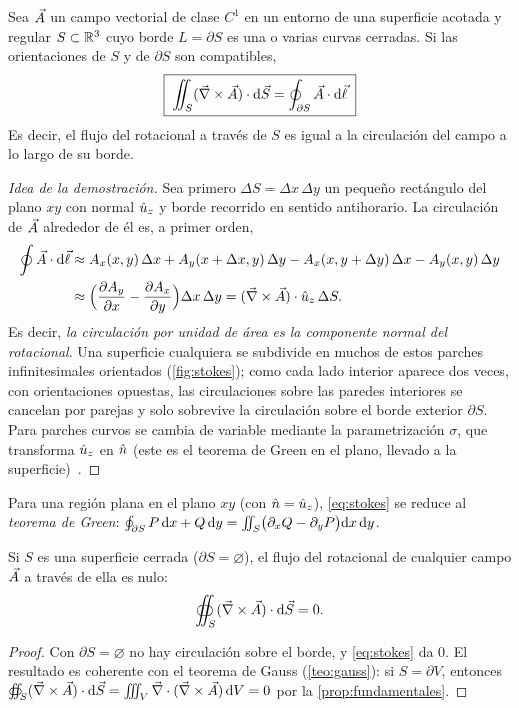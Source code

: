 \begin{teorema}\label{teo:stokes}
Sea $\vec{A}$ un campo vectorial de clase $C^{1}$ en un entorno de una superficie
acotada y regular $S\subset\mathbb{R}^{3}$ cuyo borde $L=\partial S$ es una o varias
curvas cerradas. Si las orientaciones de $S$ y de $\partial S$ son compatibles,
\begin{equation}\label{eq:stokes}
  \boxed{\;\iint_{S}(\vec{\nabla}\times\vec{A})\cdot\mathrm{d}\vec{S}=\oint_{\partial S}\vec{A}\cdot\mathrm{d}\vec{\ell}\;}
\end{equation}
Es decir, el flujo del rotacional a través de $S$ es igual a la circulación del
campo a lo largo de su borde.
\end{teorema}
\begin{proof}[Idea de la demostración]
Sea primero $\Delta S=\Delta x\,\Delta y$ un pequeño rectángulo del plano $xy$ con
normal $\hat{u}_{z}$ y borde recorrido en sentido antihorario. La circulación de
$\vec{A}$ alrededor de él es, a primer orden,
\begin{align*}
  \oint\vec{A}\cdot\mathrm{d}\vec{\ell}&\approx A_x(x,y)\,\Delta x+A_y(x+\Delta x,y)\,\Delta y
     -A_x(x,y+\Delta y)\,\Delta x-A_y(x,y)\,\Delta y\\
  &\approx\Bigl(\frac{\partial A_y}{\partial x}-\frac{\partial A_x}{\partial y}\Bigr)\Delta x\,\Delta y
   =(\vec{\nabla}\times\vec{A})\cdot\hat{u}_{z}\,\Delta S .
\end{align*}
Es decir, \emph{la circulación por unidad de área es la componente normal del
rotacional}. Una superficie cualquiera se subdivide en muchos de estos parches
infinitesimales orientados (\cref{fig:stokes}); como cada lado interior aparece
dos veces, con orientaciones opuestas, las circulaciones sobre las paredes
interiores se cancelan por parejas y solo sobrevive la circulación sobre el borde
exterior $\partial S$. Para parches curvos se cambia de variable mediante la
parametrización $\sigma$, que transforma $\hat{u}_{z}$ en $\hat{n}$ (este es el teorema de
Green en el plano, llevado a la superficie)~\cite{NAVAS}.
\end{proof}

Para una región plana en el plano $xy$ (con $\hat{n}=\hat{u}_{z}$), \cref{eq:stokes} se
reduce al \emph{teorema de Green}:
$\oint_{\partial S}P\,\mathrm{d} x+Q\,\mathrm{d} y=\iint_S\bigl(\partial_xQ-\partial_yP\bigr)\mathrm{d} x\,\mathrm{d} y$.

\begin{corolario}\label{cor:stokes-cerrada}
Si $S$ es una superficie cerrada ($\partial S=\varnothing$), el flujo del
rotacional de cualquier campo $\vec{A}$ a través de ella es nulo:
\begin{equation}\label{eq:flujo-rot-nulo}
  \oiint_{S}(\vec{\nabla}\times\vec{A})\cdot\mathrm{d}\vec{S}=0 .
\end{equation}
\end{corolario}
\begin{proof}
Con $\partial S=\varnothing$ no hay circulación sobre el borde, y
\cref{eq:stokes} da $0$. El resultado es coherente con el teorema de Gauss
(\cref{teo:gauss}): si $S=\partial V$, entonces
$\oiint_S(\vec{\nabla}\times\vec{A})\cdot\mathrm{d}\vec{S}=\iiint_V\vec{\nabla}\cdot(\vec{\nabla}\times\vec{A})\,\mathrm{d} V=0$ por
la \cref{prop:fundamentales}.
\end{proof}


